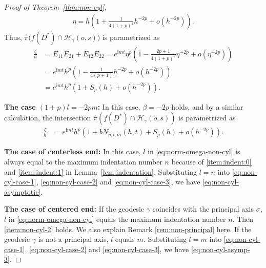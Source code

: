 \documentclass[a4paper]{amsart}
\theoremstyle{plain}
\theoremstyle{remark}
\numberwithin{equation}{section}
\begin{document}
\begin{proof}[Proof of Theorem~\ref{thm:non-cyl}]
\begin{gather*}
    \eta =
                h\left(
                    1+ \frac{1}{4(1+p)^2}h^{-2p}+o(h^{-2p})
                    \right).
 \end{gather*}
 Thus, $\hat\pi\bigl(f(D^*)\cap {\mathcal{H}}_{\gamma}(o,s)\bigr)$
 is parametrized as
 \begin{align}\label{eq:non-cyl-case-2}
   \frac{\zeta}{h} & = E_{11}\overline{E_{21}} + E_{12}\overline{E_{22}}
     =  e^{{\mathrm{i}} m t}\eta^p
        \left(1-\frac{2p+1}{4(1+p)^2}\eta^{-2p}+o(\eta^{-2p})\right) \\
    &= e^{{\mathrm{i}} m t} h^p
         \left(1-\frac{1}{4(p+1)}h^{-2p}+o(h^{-2p})\right)\nonumber\\
    &= e^{{\mathrm{i}} m t}h^p
         \left(1+S_p(h)+o(h^{-2p})\right).\nonumber
 \end{align}
\par\noindent
{\bf The case $(1+p)l=-2pm$:} 
 In this case, $\beta=-2p$ holds, and by a similar calculation,
 the intersection $\hat \pi(f(D^*)\cap {\mathcal{H}}_{\gamma}(o,s))$
 is parametrized as
 \begin{align}\label{eq:non-cyl-case-3}
   \frac{\zeta}{h} & = 
    e^{{\mathrm{i}} m t} h^p
         \left(1+bN_{p,l,m}(h,t)+S_p(h)+o(h^{-2p})\right).
 \end{align}
\par\noindent
{\bf The case of centerless end:}
 In this case, $l$ in \eqref{eq:norm-omega-non-cyl} is always 
 equal to the maximum indentation number $n$ because 
 of \ref{item:indent:0}
and \ref{item:indent:1} in
 Lemma~\ref{lem:indentation}.
 Substituting $l=n$ into \eqref{eq:non-cyl-case-1}, 
 \eqref{eq:non-cyl-case-2} and \eqref{eq:non-cyl-case-3},
 we have \eqref{eq:non-cyl-asymptotic}.
\par\noindent
{\bf The case of centered end:}
 If the geodesic $\gamma$ coincides with the principal axis $\sigma$,
 $l$ in \eqref{eq:norm-omega-non-cyl} equals the 
 maximum indentation number $n$.
 Then \ref{item:non-cyl-2} holds.
We also explain Remark \ref{rem:non-principal} here.
If the geodesic $\gamma$ is not a principal axis, $l$ equals $m$. 
Substituting $l=m$ into \eqref{eq:non-cyl-case-1},
 \eqref{eq:non-cyl-case-2} and \eqref{eq:non-cyl-case-3},
we have \eqref{eq:non-cyl-asymp-3}. 
\end{proof}
\end{document}
